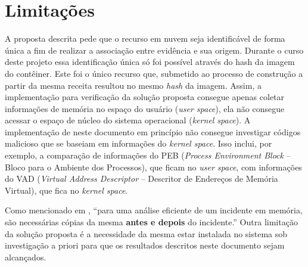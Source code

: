 

\section{Limitações}
\label{sec:proposta-limit}

A proposta descrita pede que o recurso em nuvem seja identificável de forma única a fim de realizar a associação entre evidência e sua origem.
%
Durante o curso deste projeto essa identificação única só foi possível através do hash da imagem do contêiner. Este foi o único recurso que, submetido ao processo de construção a partir da mesma receita resultou no mesmo \textit{hash} da imagem.
%
Assim, a implementação para verificação da solução proposta consegue apenas coletar informações de memória no espaço do usuário (\textit{user space}), ela não consegue acessar o espaço de núcleo do sistema operacional (\textit{kernel space}). 
%
A implementação de \fancyname neste documento em princípio não consegue investigar códigos malicioso que se baseiam em informações do \textit{kernel space}.
%
Isso inclui, por exemplo, a comparação de informações do PEB (\textit{Process Environment Block} -- Bloco para o Ambiente dos Processos), que ficam no \textit{user space}, com informações do VAD (\textit{Virtual Address Descriptor} -- Descritor de Endereços de Memória Virtual), que fica no \textit{kernel space}. 
%

Como mencionado em \cite{CaseMemoryForensics:2014}, ``para uma análise eficiente de um incidente em memória, são necessárias cópias da mesma \textbf{antes e depois} do incidente.''
%
Outra limitação da solução proposta é a necessidade da mesma estar instalada no sistema sob investigação a priori para que os resultados descritos neste documento sejam alcançados. 


